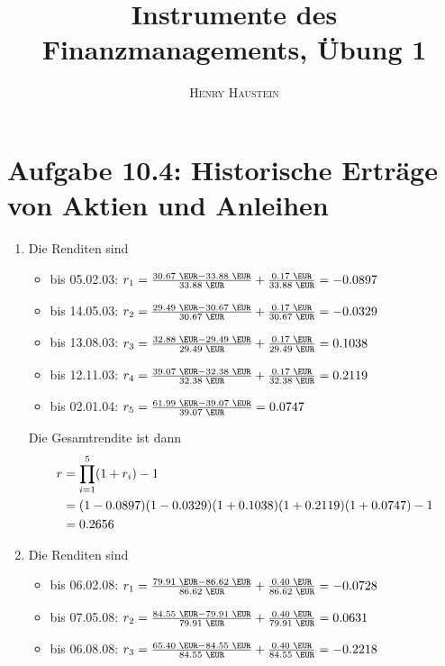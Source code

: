 \documentclass{article}
\title{\textbf{Instrumente des Finanzmanagements, Übung 1}}
\author{\textsc{Henry Haustein}}
\date{}
\begin{document}
	\maketitle

	\section*{Aufgabe 10.4: Historische Erträge von Aktien und Anleihen}
	\begin{enumerate}[label=(\alph*)]
		\item Die Renditen sind
		\begin{itemize}
			\item bis 05.02.03: $r_1=\frac{30.67\text{ \EUR} - 33.88\text{ \EUR}}{33.88\text{ \EUR}} + \frac{0.17\text{ \EUR}}{33.88\text{ \EUR}} = -0.0897$
			\item bis 14.05.03: $r_2=\frac{29.49\text{ \EUR} - 30.67\text{ \EUR}}{30.67\text{ \EUR}} + \frac{0.17\text{ \EUR}}{30.67\text{ \EUR}} = -0.0329$
			\item bis 13.08.03: $r_3=\frac{32.88\text{ \EUR} - 29.49\text{ \EUR}}{29.49\text{ \EUR}} + \frac{0.17\text{ \EUR}}{29.49\text{ \EUR}} = 0.1038$
			\item bis 12.11.03: $r_4=\frac{39.07\text{ \EUR} - 32.38\text{ \EUR}}{32.38\text{ \EUR}} + \frac{0.17\text{ \EUR}}{32.38\text{ \EUR}} = 0.2119$
			\item bis 02.01.04: $r_5=\frac{61.99\text{ \EUR} - 39.07\text{ \EUR}}{39.07\text{ \EUR}} = 0.0747$
		\end{itemize}
		Die Gesamtrendite ist dann
		\begin{align}
			r &= \prod_{i=1}^{5} (1+r_i) - 1 \notag \\
			&= (1-0.0897)(1-0.0329)(1+0.1038)(1+0.2119)(1+0.0747) - 1 \notag \\
			&= 0.2656 \notag
		\end{align}
		\item Die Renditen sind
		\begin{itemize}
			\item bis 06.02.08: $r_1=\frac{79.91\text{ \EUR} - 86.62\text{ \EUR}}{86.62\text{ \EUR}} + \frac{0.40\text{ \EUR}}{86.62\text{ \EUR}} = -0.0728$
			\item bis 07.05.08: $r_2=\frac{84.55\text{ \EUR} - 79.91\text{ \EUR}}{79.91\text{ \EUR}} + \frac{0.40\text{ \EUR}}{79.91\text{ \EUR}} = 0.0631$
			\item bis 06.08.08: $r_3=\frac{65.40\text{ \EUR} - 84.55\text{ \EUR}}{84.55\text{ \EUR}} + \frac{0.40\text{ \EUR}}{84.55\text{ \EUR}} = -0.2218$

\end{itemize}
\end{enumerate}
\end{document}
